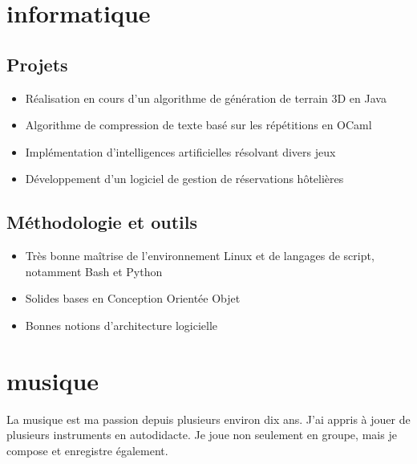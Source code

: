 \section{informatique}
\subsection{Projets}
    \begin{itemize}
        \item Réalisation en cours d'un algorithme de génération de terrain 3D en Java 
        \item Algorithme de compression de texte basé sur les répétitions en OCaml
        \item Implémentation d'intelligences artificielles résolvant divers jeux
        \item Développement d'un logiciel de gestion de réservations hôtelières
    \end{itemize}
\subsection{Méthodologie et outils}
    \begin{itemize}
        \item Très bonne maîtrise de l'environnement Linux et de langages de script, notamment Bash et Python
        \item Solides bases en Conception Orientée Objet 
        \item Bonnes notions d'architecture logicielle 
    \end{itemize}



\section{musique}
\vspace{-0.2cm}
La musique est ma passion depuis plusieurs environ dix ans.
J'ai appris à jouer de plusieurs instruments en autodidacte. Je joue non seulement en groupe, mais je compose et enregistre également.
